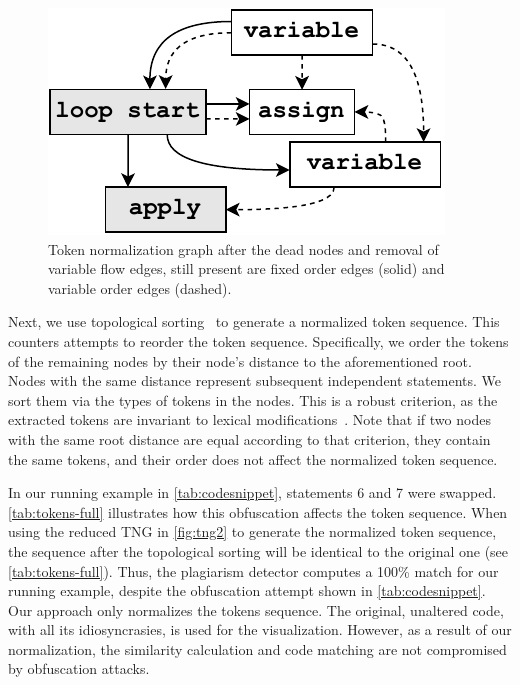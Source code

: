 \begin{figure}[b]
\centering
\includegraphics[width=0.45\linewidth]{figures/tng2b.pdf}
\caption[Reduced Token Normalization Graph]{Token normalization graph after the dead nodes and removal of variable flow edges, still present are fixed order edges (solid) and variable order edges (dashed).}
\label{fig:tng2}
\end{figure}

Next, we use topological sorting~\cite{kahn1962} to generate a normalized token sequence. This counters attempts to reorder the token sequence.
Specifically, we order the tokens of the remaining nodes by their node's distance to the aforementioned root.
Nodes with the same distance represent subsequent independent statements. We sort them via the types of tokens in the nodes.
This is a robust criterion, as the extracted tokens are invariant to lexical modifications~\cite{prechelt2002}.
Note that if two nodes with the same root distance are equal according to that criterion, they contain the same tokens, and their order does not affect the normalized token sequence. %

In our running example in \autoref{tab:codesnippet}, statements 6 and 7 were swapped.
\autoref{tab:tokens-full} illustrates how this obfuscation affects the token sequence.
When using the reduced TNG in \autoref{fig:tng2} to generate the normalized token sequence, the sequence after the topological sorting will be identical to the original one (see \autoref{tab:tokens-full}). Thus, the plagiarism detector computes a 100\% match for our running example, despite the obfuscation attempt shown in \autoref{tab:codesnippet}.
Our approach only normalizes the tokens sequence. The original, unaltered code, with all its idiosyncrasies, is used for the visualization. However, as a result of our normalization, the similarity calculation and code matching are not compromised by obfuscation attacks.




